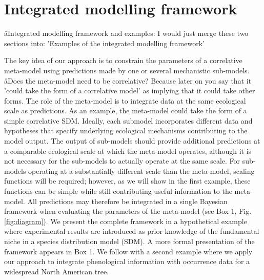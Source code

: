 
\section*{Integrated modelling framework}
\aa{Integrated modelling framework and examples: I would just merge these two sections into: 'Examples of the integrated modelling framework'}

The key idea of our approach is to constrain the parameters of a correlative meta-model using predictions made by one or several mechanistic sub-models.
\aa{Does the meta-model need to be correlative? Because later on you say that it 'could take the form of a correlative model' as implying that it could take other forms.}
The role of the meta-model is to integrate data at the same ecological scale as predictions. 
As an example, the meta-model could take the form of a simple correlative \ac{SDM}.
Ideally, each submodel incorporates different data and hypotheses that specify underlying ecological mechanisms contributing to the model output.
The output of sub-models should provide additional predictions at a comparable ecological scale at which the meta-model operates, although it is not necessary for the sub-models to actually operate at the same scale.
For sub-models operating at a substantially different scale than the meta-model, scaling functions will be required; however, as we will show in the first example, these functions can be simple while still contributing useful information to the meta-model. 
All predictions may therefore be integrated in a single Bayesian framework when evaluating the parameters of the meta-model (see Box 1, Fig. \ref{fig:diagram}).
We present the complete framework in a hypothetical example where experimental results are  introduced as prior knowledge of the fundamental niche in a species distribution model (SDM).
A more formal presentation of the framework appears in Box 1.
We follow with a second example where we apply our approach to integrate phenological information with occurrence data for a widespread North American tree.


